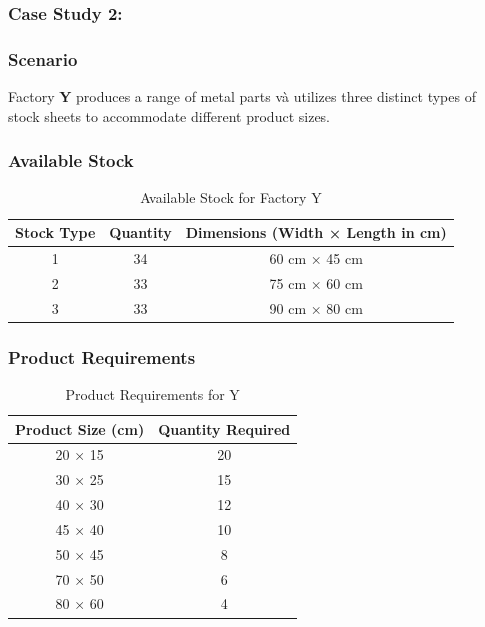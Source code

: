 \documentclass[a4paper]{article}
\begin{document}
 \subsubsection{Case Study 2:}

\subsubsection*{Scenario}
Factory \textbf{Y} produces a range of metal parts và utilizes three distinct types of stock sheets to accommodate different product sizes.

\subsubsection*{Available Stock}
\begin{table}[h!]
    \centering
    \caption{Available Stock for Factory Y}
    \begin{tabular}{|c|c|c|}
        \hline
        \textbf{Stock Type} & \textbf{Quantity} & \textbf{Dimensions (Width × Length in cm)} \\ \hline
        1 & 34 & 60 cm × 45 cm \\ \hline
        2 & 33 & 75 cm × 60 cm \\ \hline
        3 & 33 & 90 cm × 80 cm \\ \hline
    \end{tabular}
\end{table}

\subsubsection*{Product Requirements}
\begin{table}[h!]
    \centering
    \caption{Product Requirements for Y}
    \begin{tabular}{|c|c|}
        \hline
        \textbf{Product Size (cm)} & \textbf{Quantity Required} \\ \hline
        20 × 15 & 20 \\ \hline
        30 × 25 & 15 \\ \hline
        40 × 30 & 12 \\ \hline
        45 × 40 & 10 \\ \hline
        50 × 45 & 8 \\ \hline
        70 × 50 & 6 \\ \hline
        80 × 60 & 4 \\ \hline
    \end{tabular}
\end{table}
\end{document}
